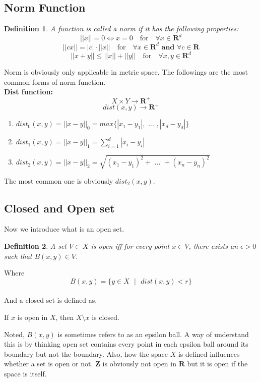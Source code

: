 \documentclass[12pt,letterpaper]{article}
\newtheorem{mydef}{Definition}
\begin{document}
\begin{normalsize}
\subsection{Norm Function}     
\begin{mydef}\label{def:def444}  
A function is called a norm if it has the following properties: 
$$||x|| = 0 \Longleftrightarrow x=0 \quad\textrm{for}\quad  \forall x \in \mathbf{R}^d$$
$$||cx|| = |c| \cdot ||x|| \quad\textrm{for}\quad \forall x \in \mathbf{R}^d \textbf{ and } \forall c \in \mathbf{R}$$
$$||x+y|| \leqslant ||x|| + ||y|| \quad \textrm{for}\quad \forall x,y \in \mathbf{R}^d$$
\end{mydef}
Norm is obviously only applicable in metric space. The followings are the most common forms of norm function. \\
\textbf{Dist function:}
$$X \times Y \longrightarrow \mathbf{R}^+$$
$$dist(x,y) \longrightarrow \mathbf{R}^+$$
\begin{enumerate}
    \item $dist_0(x,y)=||x-y||_0=max\{|x_1-y_1|, \textbf{ ... } ,|x_d-y_d|\}$
    \item $dist_1(x,y)=||x-y||_1=\sum_{i=1}^{d}|x_i-y_i|$
    \item $dist_2(x,y)=||x-y||_2=\sqrt{(x_1-y_1)^2+ \textbf{ ... }+(x_n-y_n)^2}$
\end{enumerate}
The most common one is obviously $dist_2(x,y)$.
\subsection{Closed and Open set}
Now we introduce what is an open set.
\begin{mydef}\label{def:def444}  
A set $V\subset X$ is open iff for every point $x \in V$, there exists an $\epsilon > 0$ such that $B(x,y) \in V$.
\end{mydef}
Where$$B(x,y) = \{y \in X\textbf{ } | \textbf{ }dist(x,y) <r\}$$ \\
And a closed set is defined as,
\begin{center}
    If $x$ is open in $X$, then $X \setminus x$ is closed.
\end{center}
Noted, $B(x,y)$ is sometimes refers to as an epsilon ball. A way of understand this is by thinking open set contains every point in each epsilon ball around its boundary but not the boundary. Also, how the space $X$ is defined influences whether a set is open or not. $\mathbf{Z}$ is obviously not open in $\mathbf{R}$ but it is open if the space is itself.


\end{normalsize}
\end{document}
